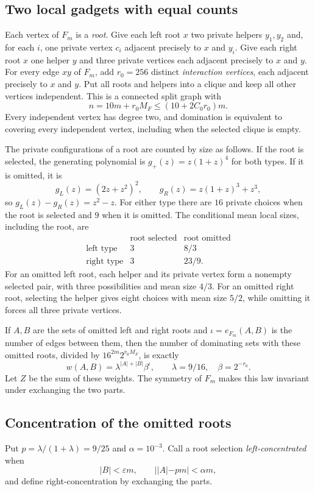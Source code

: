 \documentclass[11pt,a4paper]{article}
\theoremstyle{definition}
\theoremstyle{remark}
\begin{document}
\subsection{Two local gadgets with equal counts}
Each vertex of $F_m$ is a \emph{root}. Give each left root $x$ two private helpers $y_1,y_2$ and, for each $i$, one private vertex $c_i$ adjacent precisely to $x$ and $y_i$. Give each right root $x$ one helper $y$ and three private vertices each adjacent precisely to $x$ and $y$. For every edge $xy$ of $F_m$, add $r_0=256$ distinct \emph{interaction vertices}, each adjacent precisely to $x$ and $y$. Put all roots and helpers into a clique and keep all other vertices independent. This is a connected split graph with
\[
n=10m+r_0M_F\le(10+2C_0r_0)m .
\]
Every independent vertex has degree two, and domination is equivalent to covering every independent vertex, including when the selected clique is empty.

The private configurations of a root are counted by size as follows. If the root is selected, the generating polynomial is $g_+(z)=z(1+z)^4$ for both types. If it is omitted, it is
\[
g_L(z)=(2z+z^2)^2,\qquad g_R(z)=z(1+z)^3+z^3,
\]
so $g_L(z)-g_R(z)=z^2-z$. For either type there are $16$ private choices when the root is selected and $9$ when it is omitted. The conditional mean local sizes, including the root, are
\[
\begin{array}{c|cc}
 &\text{root selected}&\text{root omitted}\\ \hline
\text{left type}&3&8/3\\
\text{right type}&3&23/9 .
\end{array}
\]
For an omitted left root, each helper and its private vertex form a nonempty selected pair, with three possibilities and mean size $4/3$. For an omitted right root, selecting the helper gives eight choices with mean size $5/2$, while omitting it forces all three private vertices.

If $A,B$ are the sets of omitted left and right roots and $\iota=e_{F_m}(A,B)$ is the number of edges between them, then the number of dominating sets with these omitted roots, divided by $16^{2m}2^{r_0M_F}$, is exactly
\begin{equation}\label{eq:rootlaw}
w(A,B)=\lambda^{|A|+|B|}\beta^{\iota},
\qquad \lambda=9/16,\quad\beta=2^{-r_0}.
\end{equation}
Let $Z$ be the sum of these weights. The symmetry of $F_m$ makes this law invariant under exchanging the two parts.

\subsection{Concentration of the omitted roots}
Put $p=\lambda/(1+\lambda)=9/25$ and $\alpha=10^{-3}$. Call a root selection \emph{left-concentrated} when
\[
|B|<\varepsilon m,\qquad ||A|-pm|<\alpha m ,
\]
and define right-concentration by exchanging the parts.
\end{document}
